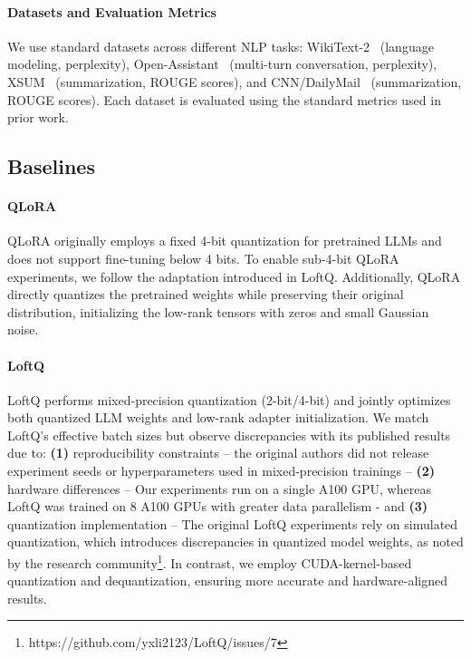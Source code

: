 \paragraph{Datasets and Evaluation Metrics} 
We use standard datasets across different NLP tasks: WikiText-2~\cite{merity2016pointer} (language modeling, perplexity), Open-Assistant~\cite{kopf2024openassistant} (multi-turn conversation, perplexity), XSUM~\cite{narayan2018don} (summarization, ROUGE scores), and CNN/DailyMail~\cite{hermann2015teaching} (summarization, ROUGE scores).
Each dataset is evaluated using the standard metrics used in prior work.

\subsection{Baselines}

\paragraph{QLoRA} 
QLoRA originally employs a fixed 4-bit quantization for pretrained LLMs and does not support fine-tuning below 4 bits. 
To enable sub-4-bit QLoRA experiments, we follow the adaptation introduced in LoftQ. 
Additionally, QLoRA directly quantizes the pretrained weights while preserving their original distribution, initializing the low-rank tensors with zeros and small Gaussian noise.

\paragraph{LoftQ}
LoftQ performs mixed-precision quantization (2-bit/4-bit) and jointly optimizes both quantized LLM weights and low-rank adapter initialization. 
We match LoftQ's effective batch sizes but observe discrepancies with its published results due to:
\textbf{(1)} reproducibility constraints – the original authors did not release experiment seeds or hyperparameters used in mixed-precision trainings –
\textbf{(2)} hardware differences – Our experiments run on a single A100 GPU, whereas LoftQ was trained on 8 A100 GPUs with greater data parallelism - and 
\textbf{(3)} quantization implementation – The original LoftQ experiments rely on simulated quantization, which introduces discrepancies in quantized model weights, as noted by the research community\footnote{https://github.com/yxli2123/LoftQ/issues/7}. 
In contrast, we employ CUDA-kernel-based quantization and dequantization, ensuring more accurate and hardware-aligned results. 

